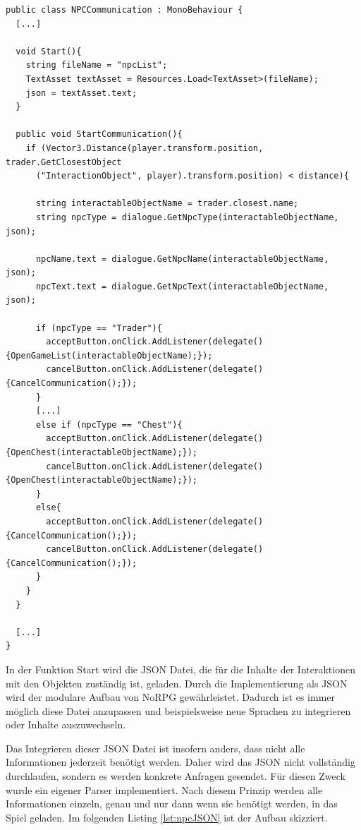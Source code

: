 	\begin{scriptsize}
		\lstset{
			float,
			caption=NPCCommunication.cs, 
			language=[Sharp]C, 
			frame=single,  
			showstringspaces=false, 
			showspaces=false, 
			numbers=left, 
			captionpos=b, 
			belowcaptionskip=4pt,
			basicstyle=\ttfamily
		} 
		\begin{lstlisting}[label=lst:npcComm]
public class NPCCommunication : MonoBehaviour {
  [...]
	
  void Start(){
    string fileName = "npcList";
    TextAsset textAsset = Resources.Load<TextAsset>(fileName);
    json = textAsset.text;
  }

  public void StartCommunication(){
    if (Vector3.Distance(player.transform.position, trader.GetClosestObject
      ("InteractionObject", player).transform.position) < distance){
		
      string interactableObjectName = trader.closest.name;
      string npcType = dialogue.GetNpcType(interactableObjectName, json);

      npcName.text = dialogue.GetNpcName(interactableObjectName, json);
      npcText.text = dialogue.GetNpcText(interactableObjectName, json);

      if (npcType == "Trader"){
        acceptButton.onClick.AddListener(delegate(){OpenGameList(interactableObjectName);});
        cancelButton.onClick.AddListener(delegate(){CancelCommunication();});
      }
      [...]
      else if (npcType == "Chest"){
        acceptButton.onClick.AddListener(delegate(){OpenChest(interactableObjectName);});
        cancelButton.onClick.AddListener(delegate(){OpenChest(interactableObjectName);});
      }
      else{
        acceptButton.onClick.AddListener(delegate(){CancelCommunication();});
        cancelButton.onClick.AddListener(delegate(){CancelCommunication();});
      }
    }
  }
		
  [...]
}
		\end{lstlisting}
	\end{scriptsize}
	
			\label{npctext}
			In der Funktion Start wird die \ac{JSON} Datei, die für die Inhalte der Interaktionen mit den Objekten zuständig ist, geladen. Durch die Implementierung als \ac{JSON} wird der modulare Aufbau von NoRPG gewährleistet. Dadurch ist es immer möglich diese Datei anzupassen und beispielsweise neue Sprachen zu integrieren oder Inhalte auszuwechseln. 
	
			Das Integrieren dieser \ac{JSON} Datei ist insofern anders, dass nicht alle Informationen jederzeit benötigt werden. Daher wird das \ac{JSON} nicht vollständig durchlaufen, sondern es werden konkrete Anfragen gesendet. Für diesen Zweck wurde ein eigener Parser implementiert. Nach diesem Prinzip werden alle Informationen einzeln, genau und nur dann wenn sie benötigt werden, in das Spiel geladen. Im folgenden Listing \ref{lst:npcJSON} ist der Aufbau skizziert.
	
